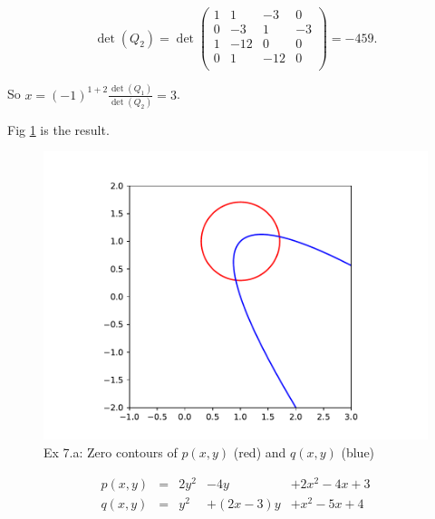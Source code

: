 \documentclass[
  course = {{16-811 Math Fundamentals for Robotics}},
  quartile = {{1}},
  assignment = 2,
  name = {{Kangle Deng}},
  email = {{kangled@andrew.cmu.edu}},
  firstexercise = 1
]{aga-homework}
\begin{document}
\begin{equation*}
    \det(Q_2) = \det \left(
    \begin{array}{cccc}
        1 & 1 & -3 & 0  \\
        0 & -3 & 1 & -3  \\
        1 & -12 & 0 & 0  \\
        0 & 1 & -12 & 0  \\
    \end{array}
    \right)
    = -459.
\end{equation*}

So $x = (-1)^{1+2} \frac{\det(Q_1)}{\det(Q_2)} = 3$.

\exercise
\subexercise
Fig \ref{fig:ex7a} is the result.

\begin{figure}
    \centering
    \includegraphics{math/fig/hw2/ex7.pdf}
    \caption{Ex 7.a: Zero contours of $p(x,y)$ (red) and $q(x,y)$ (blue)}
    \label{fig:ex7a}
\end{figure}

\subexercise
\begin{equation*}
    \begin{aligned}
        p(x,y) & = & 2y^2 & - 4y & + 2x^2 - 4x + 3 \\
        q(x,y) & = & y^2 & + (2x - 3) y & + x^2 - 5x + 4 
    \end{aligned}
\end{equation*}
\end{document}
